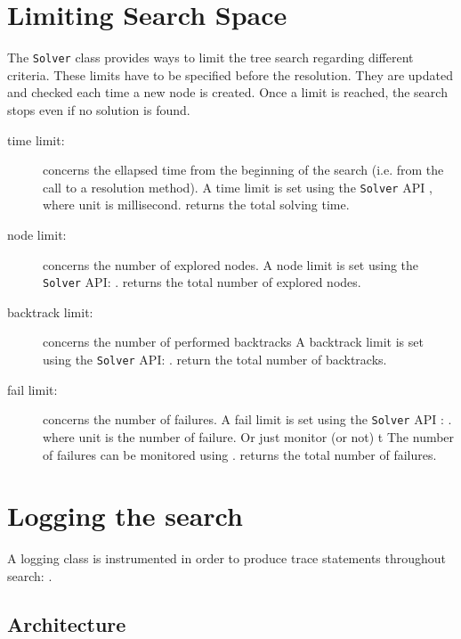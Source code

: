 \section{Limiting Search Space}\label{solver:limitingsearchspace}\hypertarget{solver:limitingsearchspace}{}
The \texttt{Solver} class provides ways to limit the tree search regarding different criteria.
These limits have to be specified before the resolution. They are updated and checked each time a new node is created. 
 Once a limit is reached, the search stops even if no solution is found.
\begin{description}
\item[time limit:] concerns the ellapsed time from the beginning of the search (i.e. from the call to a resolution method).
A time limit is set using the \texttt{Solver} API , where unit is millisecond. 
 returns the total solving time. 
\item[node limit:] concerns the number of explored nodes.
A node limit is set using the \texttt{Solver} API: .
 returns the total number of explored nodes.
\item[backtrack limit:] concerns the number of performed backtracks 
A backtrack limit is set using the \texttt{Solver} API: .
 return the total number of backtracks.
\item[fail limit:] concerns the number of failures.
A fail limit is set using the \texttt{Solver} API : .
 where unit is the number of failure. Or just monitor (or not) t
The number of failures can be monitored using .
 returns the total number of failures.
\end{description}

\section{Logging the search}\label{solver:logs}\hypertarget{solver:logs}{}
A logging class is instrumented in order to produce trace statements throughout search: . 

\subsection{Architecture }\label{solver:logarchitecture}\hypertarget{solver:logarchitecture}{}

